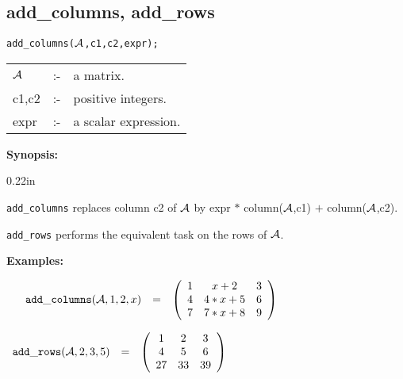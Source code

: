 \subsection{add\_columns, add\_rows}


\hspace*{0.175in} {\tt add\_columns(${\cal A}$,c1,c2,expr);}

\hspace*{0.1in}
\begin{tabular}{l l l}
${\cal A}$ & :- & a matrix. \\
c1,c2      & :- & positive integers. \\
expr       & :- & a scalar expression.
\end{tabular}

{\bf Synopsis:} %

\begin{addtolength}{\leftskip}{0.22in}
\parbox[t]{0.95\linewidth}{{\tt add\_columns} replaces column c2 of
${\cal A}$ by expr $*$ column(${\cal A}$,c1) $+$ column(${\cal A}$,c2).}

{\tt add\_rows} performs the equivalent task on the rows of ${\cal A}$.

\end{addtolength}

{\bf Examples:}

\begin{flushleft}
\begin{math}
\hspace*{0.16in}
\begin{array}{ccc}
{\tt add\_columns}({\cal A},1,2,x) & = &
\left( \begin{array}{ccc} 1 & x+2 & 3 \\ 4 & 4*x+5 & 6 \\ 7 & 7*x+8 & 9
\end{array} \right)
\end{array}
\end{math}
\end{flushleft}

\vspace*{0.1in}

\begin{flushleft}
\hspace*{0.1in}
\begin{math}
\begin{array}{ccc}
{\tt add\_rows}({\cal A},2,3,5) & = &
\left( \begin{array}{ccc} 1 & 2 & 3 \\ 4 & 5 & 6 \\ 27 & 33 & 39
\end{array} \right)
\end{array}
\end{math}
\end{flushleft}

